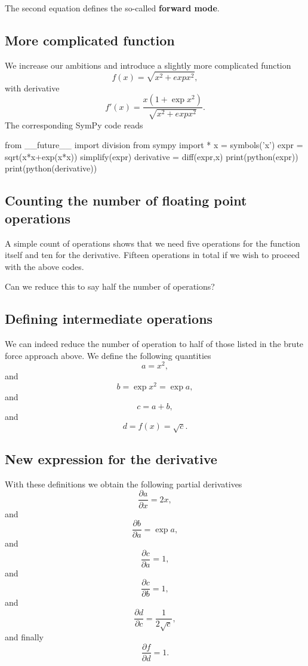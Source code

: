 \documentclass[%
oneside,                 %
final,                   %
10pt]{article}
\begin{document}
The second equation defines the so-called  \textbf{forward mode}.

\subsection{More complicated function}

We increase our ambitions and introduce a slightly more complicated function
\[
f(x) =\sqrt{x^2+exp{x^2}},
\]
with derivative
\[
f'(x) =\frac{x(1+\exp{x^2})}{\sqrt{x^2+exp{x^2}}}.
\]
The corresponding SymPy code reads









\bpycod
from __future__ import division
from sympy import *
x = symbols('x')
expr = sqrt(x*x+exp(x*x))
simplify(expr)
derivative = diff(expr,x)
print(python(expr))
print(python(derivative))

\epycod


\subsection{Counting the number of floating point operations}

A simple count of operations shows that we need five operations for
the function itself and ten for the derivative.  Fifteen operations in total if we wish to proceed with the above codes.

Can we reduce this to
say half the number of operations?

\subsection{Defining intermediate operations}

We can indeed reduce the number of operation to half of those listed in the brute force approach above.
We define the following quantities
\[
a = x^2,
\]
and
\[
b = \exp{x^2} = \exp{a},
\]
and
\[
c= a+b,
\]
and
\[
d=f(x)=\sqrt{c}.
\]

\subsection{New expression for the derivative}

With these definitions we obtain the following partial derivatives 
\[
\frac{\partial a}{\partial x} = 2x,
\]
and
\[
\frac{\partial b}{\partial a} = \exp{a},
\]
and
\[
\frac{\partial c}{\partial a} = 1,
\]
and
\[
\frac{\partial c}{\partial b} = 1,
\]
and
\[
\frac{\partial d}{\partial c} = \frac{1}{2\sqrt{c}},
\]
and finally
\[
\frac{\partial f}{\partial d} = 1.
\]
\end{document}
